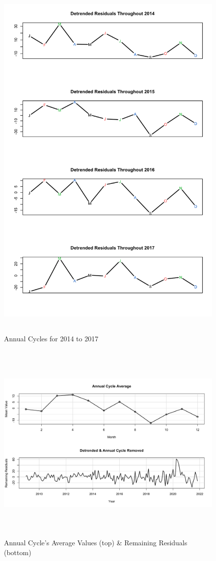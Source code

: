\documentclass[10pt]{article}
\begin{document}
\begin{figure}[ht!]
    \centering
    \includegraphics[height=185mm, width=135mm]{annual-cycles.png}
    \caption{Annual Cycles for 2014 to 2017}
\end{figure}

\begin{figure}[ht!]
    \centering
    \includegraphics[height=100mm, width=125mm]{annual-cyc-removed.png}
    \caption{Annual Cycle's Average Values (top) \& Remaining Residuals (bottom)}
\end{figure}
\end{document}
